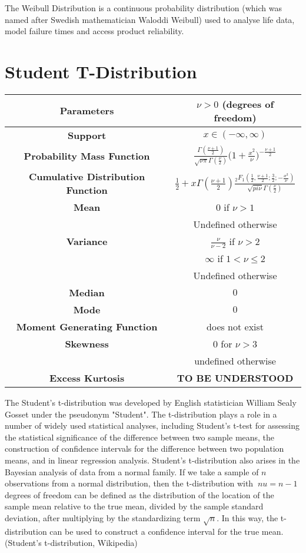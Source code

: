 \documentclass[14pt, a4paper]{article}
\theoremstyle{definition}
\begin{document}
The Weibull Distribution is a continuous probability distribution (which was named after Swedish mathematician Waloddi Weibull) used to analyse life data, model failure times and access product reliability. 

\section{Student T-Distribution}

\begin{tabular}{|c|c|}  %
\hline
 \textbf{Parameters }& $\nu > 0$ (degrees of freedom) \\
 \hline
 \textbf{Support} & $x \in (- \infty,\infty)$ \\
 \hline
 \textbf{Probability Mass Function} & $\frac{\Gamma (\frac{\nu +1}{2})}{\sqrt{\nu \pi} \Gamma(\frac{\nu}{2})} \Big( 1+ \frac{x^2}{\nu} \Big) ^{- \frac{\nu+1}{2}}$ \\
 \hline
 \textbf{Cumulative Distribution Function} & $\frac{1}{2} + x \Gamma(\frac{\nu+1}{2} ) \frac{_2F_1 (\frac{1}{2} , \frac{\nu + 1}{2} ; \frac{3}{2} ; - \frac{x^2}{\nu} )}{\sqrt{pi \nu } \Gamma(\frac{\nu}{2} )}$  \\
 \hline
 \textbf{Mean} & $0$ if $\nu > 1$ \\ & Undefined otherwise\\ 
 \hline
 \textbf{Variance} & $\frac{\nu}{\nu - 2}$ if $\nu > 2$ \\ & $\infty$ if $1 < \nu \leq 2$ \\ & Undefined otherwise \\
 \hline
 \textbf{Median} &  $0$\\ 
 \hline
 \textbf{Mode} & $0$\\
 \hline
 \textbf{Moment Generating Function} & does not exist \\
 \hline
 \textbf{Skewness} & $0 $ for $ \nu > 3 $ \\ & undefined otherwise \\
 \hline
 \textbf{Excess Kurtosis} & \textbf{TO BE UNDERSTOOD} \\
 \hline
       
  \end{tabular}

The Student's t-distribution was developed by English statistician William Sealy Gosset under the pseudonym "Student". The t-distribution plays a role in a number of widely used statistical analyses, including Student's t-test for assessing the statistical significance of the difference between two sample means, the construction of confidence intervals for the difference between two population means, and in linear regression analysis. Student's t-distribution also arises in the Bayesian analysis of data from a normal family. If we take a sample of $n$ observations from a normal distribution, then the t-distribution with $ \ nu =n-1$ degrees of freedom can be defined as the distribution of the location of the sample mean relative to the true mean, divided by the sample standard deviation, after multiplying by the standardizing term $\sqrt {n}$. In this way, the t-distribution can be used to construct a confidence interval for the true mean.(Student's t-distribution, Wikipedia)
\end{document}
